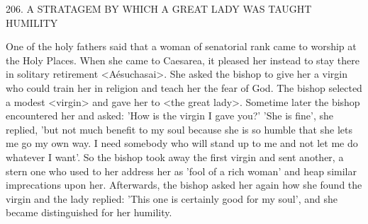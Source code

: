 206. A STRATAGEM BY WHICH A GREAT
LADY WAS TAUGHT HUMILITY

One of the holy fathers said that a woman of senatorial rank came
to worship at the Holy Places. When she came to Caesarea, it
pleased her instead to stay there in solitary retirement <Aésuchasai>.
She asked the bishop to give her a virgin who could train her in
religion and teach her the fear of God. The bishop selected a
modest <virgin> and gave her to <the great lady>. Sometime later
the bishop encountered her and asked: 'How is the virgin I gave
you?' 'She is fine', she replied, 'but not much benefit to my soul
because she is so humble that she lets me go my own way. I need
somebody who will stand up to me and not let me do whatever I
want'. So the bishop took away the first virgin and sent another, a
stern one who used to her address her as 'fool of a rich woman' and
heap similar imprecations upon her. Afterwards, the bishop asked
her again how she found the virgin and the lady replied: 'This one
is certainly good for my soul', and she became distinguished for her
humility.

